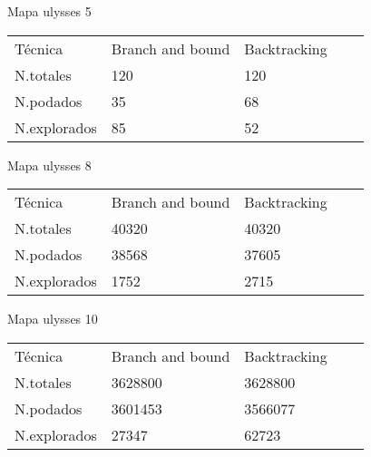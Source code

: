		

	
	



		\begin{table}[H]
							Mapa ulysses 5
			\centering
			
			\label{my-label}
			\begin{tabular}{lllll}
				Técnica	& Branch and bound & Backtracking  &   \\
				N.totales& 120&120  &  &  \\
				N.podados&  35& 68 &  &  \\
				N.explorados&85  &52  &  &  \\
				
			\end{tabular}
		\end{table}
		

	
	



		\begin{table}[H]
			Mapa ulysses 8
			\centering
			
			\label{my-label}
			\begin{tabular}{lllll}
				Técnica	& Branch and bound & Backtracking  &   \\
				N.totales& 40320&40320  &  &  \\
				N.podados&  38568& 37605 &  &  \\
				N.explorados&1752  &2715 &  &  \\
				
			\end{tabular}
		\end{table}
		

	
	


 
		\begin{table}[H]
							Mapa ulysses 10
			\centering
			
			\label{my-label}
			\begin{tabular}{lllll}
				Técnica	& Branch and bound & Backtracking  &   \\
				N.totales& 3628800&3628800  &  &  \\
				N.podados&  3601453& 3566077 &  &  \\
				N.explorados&27347  &62723  &  &  \\
				
			\end{tabular}
		\end{table}
		

